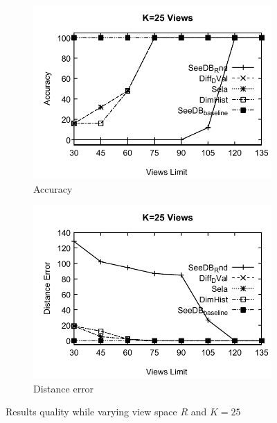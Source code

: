 \begin{figure}[t]
  \centering
  \begin{subfigure}[b]{0.42\textwidth}
    \includegraphics[width=\textwidth]{21.pdf}
    \caption{Accuracy}
        \label{fig:fig1}%
  \end{subfigure}
  \begin{subfigure}[b]{0.42\textwidth}
    \includegraphics[width=\textwidth]{22.pdf}
     \caption{Distance error}
        \label{fig:figa2}
  \end{subfigure}
  \caption{Results quality while varying view space $R$ and $K = 25$}
\end{figure}


